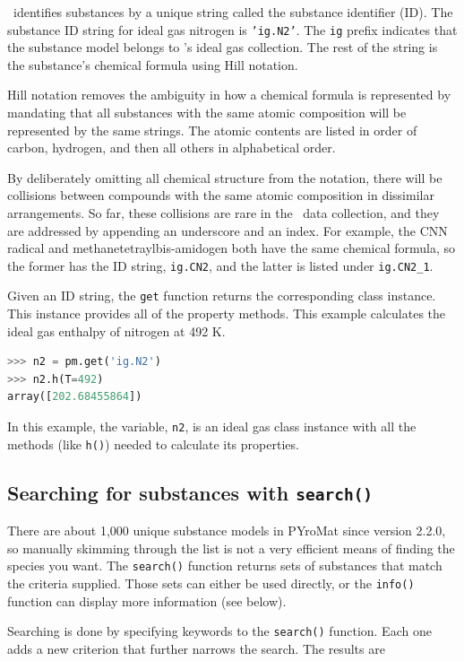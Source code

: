 \PM\ identifies substances by a unique string called the substance identifier (ID).  The substance ID string for ideal gas nitrogen is \texttt{'ig.N2'}.  The \texttt{ig} prefix indicates that the substance model belongs to \PM's ideal gas collection.  The rest of the string is the substance's chemical formula using Hill notation.  

Hill notation removes the ambiguity in how a chemical formula is represented by mandating that all substances with the same atomic composition will be represented by the same strings.  The atomic contents are listed in order of carbon, hydrogen, and then all others in alphabetical order.

By deliberately omitting all chemical structure from the notation, there will be collisions between compounds with the same atomic composition in dissimilar arrangements.  So far, these collisions are rare in the \PM\ data collection, and they are addressed by appending an underscore and an index.  For example, the CNN radical and methanetetraylbis-amidogen both have the same chemical formula, so the former has the ID string, \texttt{ig.CN2}, and the latter is listed under \verb|ig.CN2_1|.

Given an ID string, the \texttt{get} function returns the corresponding class instance.  This instance provides all of the property methods.  This example calculates the ideal gas enthalpy of nitrogen at 492 K.
\begin{lstlisting}[language=Python]
>>> n2 = pm.get('ig.N2')
>>> n2.h(T=492)
array([202.68455864])
\end{lstlisting}

In this example, the variable, \texttt{n2}, is an ideal gas class instance with all the methods (like \texttt{h()}) needed to calculate its properties.


\subsection{Searching for substances with \texttt{search()}}

There are about 1,000 unique substance models in PYroMat since version 2.2.0, so manually skimming through the list is not a very efficient means of finding the species you want.  The \texttt{search()} function returns sets of substances that match the criteria supplied.  Those sets can either be used directly, or the \texttt{info()} function can display more information (see below).

Searching is done by specifying keywords to the \texttt{search()} function.  Each one adds a new criterion that further narrows the search.  The results are 

